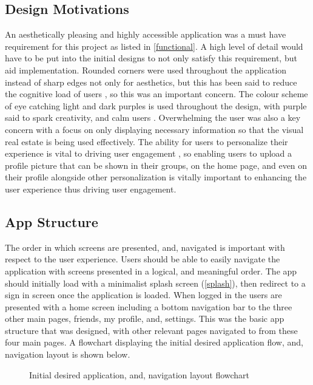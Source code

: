 \subsection*{Design Motivations}
An aesthetically pleasing and highly accessible application was a must have requirement for this project as listed in \ref{functional}. A high level of detail would have to be put into the initial designs to not only satisfy this requirement, but aid implementation. Rounded corners were used throughout the application instead of sharp edges not only for aesthetics, but this has been said to reduce the cognitive load of users \cite{roundedCorners}, so this was an important concern. The colour scheme of eye catching light and dark purples is used throughout the design, with purple said to spark creativity, and calm users \cite{purplePsych}. Overwhelming the user was also a key concern with a focus on only displaying necessary information so that the visual real estate is being used effectively. The ability for users to personalize their experience is vital to driving user engagement \cite{customUserEng}, so enabling users to upload a profile picture that can be shown in their groups, on the home page, and even on their profile alongside other personalization is vitally important to enhancing the user experience thus driving user engagement. 

\subsection*{App Structure}
The order in which screens are presented, and, navigated is important with respect to the user experience. Users should be able to easily navigate the application with screens presented in a logical, and meaningful order. The app should initially load with a minimalist splash screen (\ref{splash}), then redirect to a sign in screen once the application is loaded. When logged in the users are presented with a home screen including a bottom navigation bar to the three other main pages, friends, my profile, and, settings. This was the basic app structure that was designed, with other relevant pages navigated to from these four main pages. A flowchart displaying the initial desired application flow, and, navigation layout is shown below. 

\begin{figure}[!htbp]
    \centering
    \begin{subfigure}[b]{0.6\textwidth}
    \end{subfigure}
    \caption{Initial desired application, and, navigation layout flowchart} 
    \label{fig:layoutFlow}
\end{figure}
\FloatBarrier

